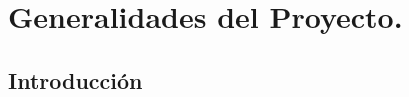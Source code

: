 \chapter{Generalidades del Proyecto.}
\newpage
\begin{center}
    \section*{Introducción}        
\end{center}
